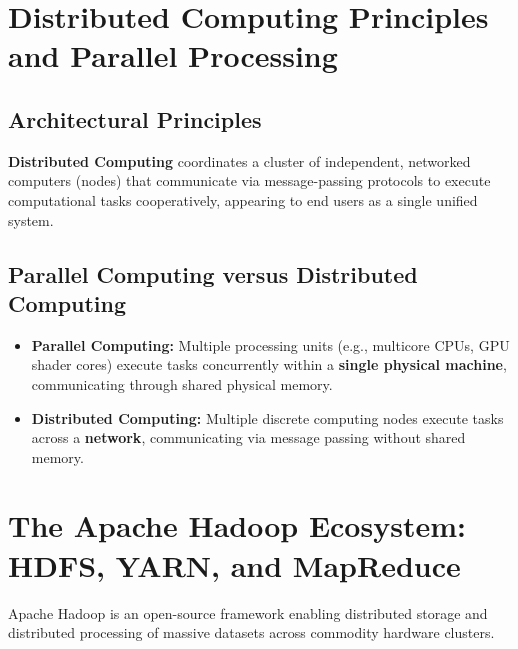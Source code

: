 \section{Distributed Computing Principles and Parallel Processing}
\label{sec:distributed_computing}

\subsection{Architectural Principles}
\textbf{Distributed Computing} coordinates a cluster of independent, networked computers (nodes) that communicate via message-passing protocols to execute computational tasks cooperatively, appearing to end users as a single unified system.

\subsection{Parallel Computing versus Distributed Computing}
\begin{itemize}
    \item \textbf{Parallel Computing:} Multiple processing units (e.g., multicore CPUs, GPU shader cores) execute tasks concurrently within a \textbf{single physical machine}, communicating through shared physical memory.
    \item \textbf{Distributed Computing:} Multiple discrete computing nodes execute tasks across a \textbf{network}, communicating via message passing without shared memory.
\end{itemize}


\section{The Apache Hadoop Ecosystem: HDFS, YARN, and MapReduce}
\label{sec:hadoop_ecosystem}

Apache Hadoop is an open-source framework enabling distributed storage and distributed processing of massive datasets across commodity hardware clusters.

